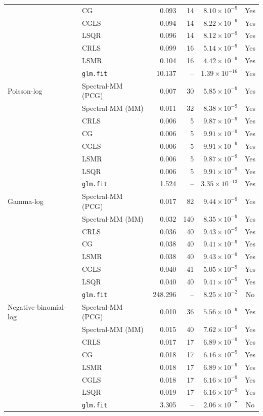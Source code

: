 \begin{longtable}{llrrrc}
 & CG & 0.093 & 14 & $8.10\times10^{-9}$ & Yes \\
 & CGLS & 0.094 & 14 & $8.22\times10^{-9}$ & Yes \\
 & LSQR & 0.096 & 14 & $8.12\times10^{-9}$ & Yes \\
 & CRLS & 0.099 & 16 & $5.14\times10^{-9}$ & Yes \\
 & LSMR & 0.104 & 16 & $4.42\times10^{-9}$ & Yes \\
 & \texttt{glm.fit} & 10.137 & -- & $1.39\times10^{-16}$ & Yes \\
\midrule
Poisson-log & Spectral-MM (PCG) & 0.007 & 30 & $5.85\times10^{-9}$ & Yes \\
 & Spectral-MM (MM) & 0.011 & 32 & $8.38\times10^{-9}$ & Yes \\
 & CRLS & 0.006 & 5 & $9.87\times10^{-9}$ & Yes \\
 & CG & 0.006 & 5 & $9.91\times10^{-9}$ & Yes \\
 & CGLS & 0.006 & 5 & $9.91\times10^{-9}$ & Yes \\
 & LSMR & 0.006 & 5 & $9.87\times10^{-9}$ & Yes \\
 & LSQR & 0.006 & 5 & $9.91\times10^{-9}$ & Yes \\
 & \texttt{glm.fit} & 1.524 & -- & $3.35\times10^{-13}$ & Yes \\
\midrule
Gamma-log & Spectral-MM (PCG) & 0.017 & 82 & $9.44\times10^{-9}$ & Yes \\
 & Spectral-MM (MM) & 0.032 & 140 & $8.35\times10^{-9}$ & Yes \\
 & CRLS & 0.036 & 40 & $9.43\times10^{-9}$ & Yes \\
 & CG & 0.038 & 40 & $9.41\times10^{-9}$ & Yes \\
 & LSMR & 0.038 & 40 & $9.43\times10^{-9}$ & Yes \\
 & CGLS & 0.040 & 41 & $5.05\times10^{-9}$ & Yes \\
 & LSQR & 0.040 & 40 & $9.41\times10^{-9}$ & Yes \\
 & \texttt{glm.fit} & 248.296 & -- & $8.25\times10^{-2}$ & No \\
\midrule
Negative-binomial-log & Spectral-MM (PCG) & 0.010 & 36 & $5.56\times10^{-9}$ & Yes \\
 & Spectral-MM (MM) & 0.015 & 40 & $7.62\times10^{-9}$ & Yes \\
 & CRLS & 0.017 & 17 & $6.89\times10^{-9}$ & Yes \\
 & CG & 0.018 & 17 & $6.16\times10^{-9}$ & Yes \\
 & LSMR & 0.018 & 17 & $6.89\times10^{-9}$ & Yes \\
 & CGLS & 0.018 & 17 & $6.16\times10^{-9}$ & Yes \\
 & LSQR & 0.019 & 17 & $6.16\times10^{-9}$ & Yes \\
 & \texttt{glm.fit} & 3.305 & -- & $2.06\times10^{-7}$ & No \\
\end{longtable}
